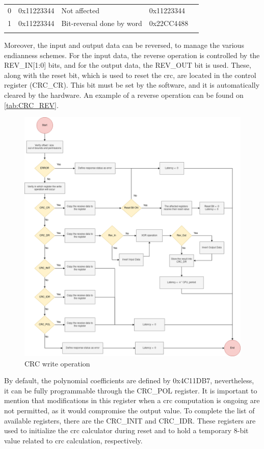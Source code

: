 \begin{table}[H]
\begin{minipage}{.5\linewidth}
{\begin{tabular}{lllll}
		\multicolumn{1}{|l|}{0} & \multicolumn{1}{l|}{0x11223344} & \multicolumn{1}{l|}{Not affected} & \multicolumn{1}{l|}{0x11223344} &  \\ \cline{1-4}
		\multicolumn{1}{|l|}{1} & \multicolumn{1}{l|}{0x11223344} & \multicolumn{1}{l|}{Bit-reversal done by word} & \multicolumn{1}{l|}{0x22CC4488} &  \\ \cline{1-4}
		 &  &  &  & 
		\end{tabular}%
        }   
        \label{tab:CRC_REV_OUT}
    \end{minipage}
	\label{tab:CRC_REV} 
\end{table}

Moreover, the input and output data can be reversed, to manage the various endianness schemes. For the input data, the reverse operation 
is controlled by the REV\_IN[1:0] bits, and for the output data, the REV\_OUT bit is used. These, along with the reset bit, which is used to 
reset the \gls{crc}, are located in the control register (CRC\_CR). This bit must be set by the software, and it is automatically cleared by
the hardware. An example of a reverse operation can be found on \autoref{tab:CRC_REV}.

\begin{figure}[H]
	\centering
 	\includegraphics[width=0.66\linewidth]{Images/CRC_write.png}
 	\caption{CRC write operation}
	 \label{fig_CRC_write}
\end{figure}

By default, the polynomial coefficients are defined by 0x4C11DB7, nevertheless, it can be fully programmable through the CRC\_POL register.
It is important to mention that modifications in this register when a \gls{crc} computation is ongoing are not permitted, as it would 
compromise the output value. To complete the list of available registers, there are the CRC\_INIT and CRC\_IDR.  
These registers are used to initialize the \gls{crc} calculator during reset and to hold a temporary 8-bit value related to \gls{crc} 
calculation, respectively.

